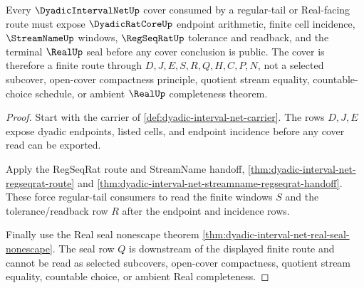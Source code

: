 \begin{theorem}
\label{thm:dyadic-interval-net-regular-tail-cover}
Every $\DyadicIntervalNetUp$ cover consumed by a regular-tail or Real-facing route must expose $\DyadicRatCoreUp$ endpoint arithmetic, finite cell incidence, $\StreamNameUp$ windows, $\RegSeqRatUp$ tolerance and readback, and the terminal $\RealUp$ seal before any cover conclusion is public. The cover is therefore a finite route through $D,J,E,S,R,Q,H,C,P,N$, not a selected subcover, open-cover compactness principle, quotient stream equality, countable-choice schedule, or ambient $\RealUp$ completeness theorem.
\end{theorem}
\begin{proof}
Start with the carrier of \autoref{def:dyadic-interval-net-carrier}. The rows $D,J,E$ expose dyadic endpoints, listed cells, and endpoint incidence before any cover read can be exported.

Apply the RegSeqRat route and StreamName handoff, \autoref{thm:dyadic-interval-net-regseqrat-route} and \autoref{thm:dyadic-interval-net-streamname-regseqrat-handoff}. These force regular-tail consumers to read the finite windows $S$ and the tolerance/readback row $R$ after the endpoint and incidence rows.

Finally use the Real seal nonescape theorem \autoref{thm:dyadic-interval-net-real-seal-nonescape}. The seal row $Q$ is downstream of the displayed finite route and cannot be read as selected subcovers, open-cover compactness, quotient stream equality, countable choice, or ambient Real completeness.
\end{proof}


\begin{closurestatus}{\DyadicIntervalNetUp}
  \theoryclosure{\seedClosure}
  \formalstatus{\unformalizedV}
\end{closurestatus}
